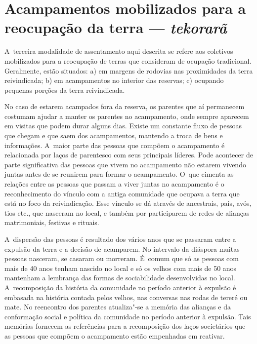 \section{Acampamentos mobilizados para a reocupação da terra --- \emph{tekorarã}}

A~terceira modalidade de assentamento aqui descrita se refere aos
coletivos mobilizados para a reocupação de terras que consideram de
ocupação tradicional. Geralmente, estão situados: a) em margens de
rodovias nas proximidades da terra reivindicada; b) em acampamentos no
interior das reservas; c) ocupando pequenas porções da terra
reivindicada. 

No caso de estarem acampados fora da reserva, os parentes que aí
permanecem costumam ajudar a manter os parentes no acampamento, onde
sempre aparecem em visitas que podem durar alguns dias. Existe um
constante fluxo de pessoas que chegam e que saem dos acampamentos,
mantendo a troca de bens e informações. A~maior parte das pessoas que
compõem o acampamento é relacionada por laços de parentesco com seus
principais líderes. Pode acontecer de parte significativa das pessoas
que vivem no acampamento não estarem vivendo juntas antes de se
reunirem para formar o acampamento. O~que cimenta as relações entre as
pessoas que passam a viver juntas no acampamento é o reconhecimento do
vínculo com a antiga comunidade que ocupava a terra que está no foco da
reivindicação. Esse vínculo se dá através de ancestrais, pais, avós,
tios etc., que nasceram no local, e também por participarem de redes de
alianças matrimoniais, festivas e rituais. 

A~dispersão das pessoas é resultado dos vários anos que se passaram
entre a expulsão da terra e a decisão de acamparem. No intervalo da
diáspora muitas pessoas nasceram, se casaram ou morreram. É~comum que
só as pessoas com mais de 40 anos tenham nascido no local e só os
velhos com mais de 50 anos mantenham a lembrança das formas de
sociabilidade desenvolvidas no local. A~recomposição da história da
comunidade no período anterior à expulsão é embasada na história
contada pelos velhos, nas conversas nas rodas de tereré ou mate. No
reencontro dos parentes atualiza"-se a memória das alianças e da
conformação social e política da comunidade no período anterior à
expulsão. Tais memórias fornecem as referências para a recomposição dos
laços societários que as pessoas que compõem o acampamento estão
empenhadas em reativar. 

